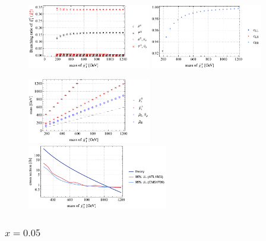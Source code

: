 \documentclass[a4paper,10pt,captions=tableheading,DIV=14]{scrartcl}
\numberwithin{equation}{section}
\begin{document}
\begin{figure}[h!]\centering
  \includegraphics[height=80pt]{../plots/plot_tab2x050_br21.pdf}
  \includegraphics[height=80pt]{../plots/plot_tab2x050_cfactors.pdf}\par
  \includegraphics[height=80pt]{../plots/plot_tab2x050_mass.pdf}
  \includegraphics[height=80pt]{../plots/plot_tab2x050_limit.pdf}
\end{figure}

\clearpage

\subsubsection{$x=0.05$}
\end{document}
